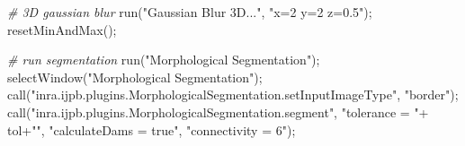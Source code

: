 \documentclass[10pt, b5paper, singlespacinge, twoside]{reedthesis} %
\newenvironment{Shaded}{}{}
\newcommand{\CommentTok}[1]{\textit{#1}}
\newcommand{\FunctionTok}[1]{#1}
\newcommand{\NormalTok}[1]{#1}
\newcommand{\SpecialCharTok}[1]{#1}
\newcommand{\StringTok}[1]{#1}
\theoremstyle{definition}
\theoremstyle{definition}
\theoremstyle{definition}
\theoremstyle{remark}
\begin{document}
\scriptsize
\begin{Shaded}
\begin{Highlighting}[numbers=left,,]
\CommentTok{\# 3D gaussian blur}
    \FunctionTok{run}\NormalTok{(}\StringTok{"Gaussian Blur 3D..."}\NormalTok{, }\StringTok{"x=2 y=2 z=0.5"}\NormalTok{);}
    \FunctionTok{resetMinAndMax}\NormalTok{();}

\CommentTok{\# run segmentation}
    \FunctionTok{run}\NormalTok{(}\StringTok{"Morphological Segmentation"}\NormalTok{);}
    \FunctionTok{selectWindow}\NormalTok{(}\StringTok{"Morphological Segmentation"}\NormalTok{);}
    \FunctionTok{call}\NormalTok{(}\StringTok{"inra.ijpb.plugins.MorphologicalSegmentation.setInputImageType"}\NormalTok{, }\StringTok{"border"}\NormalTok{);}
    \FunctionTok{call}\NormalTok{(}\StringTok{"inra.ijpb.plugins.MorphologicalSegmentation.segment"}\NormalTok{, }\StringTok{"tolerance = "}\SpecialCharTok{+}\NormalTok{ tol}\SpecialCharTok{+}\StringTok{""}\NormalTok{,}
         \StringTok{"calculateDams = true"}\NormalTok{, }\StringTok{"connectivity = 6"}\NormalTok{);}


\end{Highlighting}
\end{Shaded}
\end{document}
